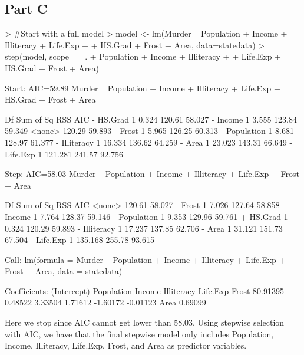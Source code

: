 \documentclass{article}
\begin{document}
\subsection{Part C}
\begin{Schunk}
\begin{Sinput}
> #Start with a full model
> model <- lm(Murder ~ Population + Income + Illiteracy + Life.Exp + 
+               HS.Grad + Frost + Area, data=statedata)
> step(model, scope= ~ . + Population + Income + Illiteracy + 
+        Life.Exp + HS.Grad + Frost + Area)
\end{Sinput}
\begin{Soutput}
Start:  AIC=59.89
Murder ~ Population + Income + Illiteracy + Life.Exp + HS.Grad + 
    Frost + Area

             Df Sum of Sq    RSS    AIC
- HS.Grad     1     0.324 120.61 58.027
- Income      1     3.555 123.84 59.349
<none>                    120.29 59.893
- Frost       1     5.965 126.25 60.313
- Population  1     8.681 128.97 61.377
- Illiteracy  1    16.334 136.62 64.259
- Area        1    23.023 143.31 66.649
- Life.Exp    1   121.281 241.57 92.756

Step:  AIC=58.03
Murder ~ Population + Income + Illiteracy + Life.Exp + Frost + 
    Area

             Df Sum of Sq    RSS    AIC
<none>                    120.61 58.027
- Frost       1     7.026 127.64 58.858
- Income      1     7.764 128.37 59.146
- Population  1     9.353 129.96 59.761
+ HS.Grad     1     0.324 120.29 59.893
- Illiteracy  1    17.237 137.85 62.706
- Area        1    31.121 151.73 67.504
- Life.Exp    1   135.168 255.78 93.615

Call:
lm(formula = Murder ~ Population + Income + Illiteracy + Life.Exp + 
    Frost + Area, data = statedata)

Coefficients:
(Intercept)   Population       Income   Illiteracy     Life.Exp        Frost  
   80.91395      0.48522      3.33504      1.71612     -1.60172     -0.01123  
       Area  
    0.69099  
\end{Soutput}
\end{Schunk}

\noindent Here we stop since AIC cannot get lower than 58.03. Using stepwise selection with AIC, we have that the final stepwise model only includes Population, Income, Illiteracy, Life.Exp, Frost, and Area as predictor variables.
\end{document}
